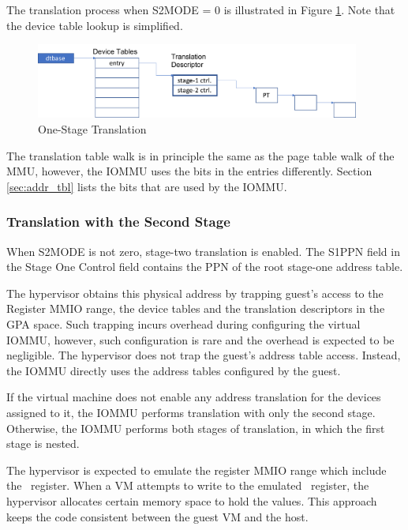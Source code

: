 The translation process when S2MODE = 0 is illustrated in Figure \ref{fig:one-stage-trans}.
Note that the device table lookup is simplified.

\begin{figure}[ht!]
    \centering
    \includegraphics[width=0.95\textwidth]{img/one-stage-trans.pdf}
    \caption{One-Stage Translation}
    \label{fig:one-stage-trans}
\end{figure}

The translation table walk is in principle the same as the page table walk of the MMU,
however, the IOMMU uses the bits in the entries differently. Section \ref{sec:addr_tbl}
lists the bits that are used by the IOMMU.

\subsubsection{Translation with the Second Stage}

When S2MODE is not zero, stage-two translation is enabled. The S1PPN field in the Stage
One Control field contains the PPN of the root stage-one address table.

The hypervisor obtains this physical address by trapping guest's access to the Register
MMIO range, the device tables and the translation descriptors in the GPA space. Such
trapping incurs overhead during configuring the virtual IOMMU, however, such configuration
is rare and the overhead is expected to be negligible. The hypervisor does not trap the
guest's address table access. Instead, the IOMMU directly uses the address tables
configured by the guest.

If the virtual machine does not enable any address translation for the devices assigned to
it, the IOMMU performs translation with only the second stage. Otherwise, the IOMMU
performs both stages of translation, in which the first stage is nested.

The hypervisor is expected to emulate the register MMIO range which include the
\dtbase\ register. When a VM attempts to write to the emulated \dtbase\
register, the hypervisor allocates certain memory space to hold the values. This
approach keeps the code consistent between the guest VM and the host. 

